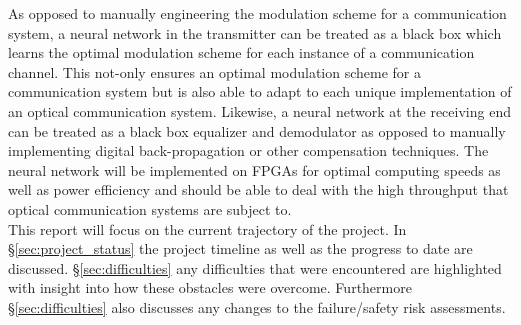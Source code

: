 As opposed to manually engineering the modulation scheme for a communication system, a neural network in the transmitter can be treated as a black box which learns the optimal modulation scheme for each instance of a communication channel. This not-only ensures an optimal modulation scheme for a communication system but is also able to adapt to each unique implementation of an optical communication system. Likewise, a neural network at the receiving end can be treated as a black box equalizer and demodulator as opposed to manually implementing digital back-propagation or other compensation techniques. The neural network will be implemented on FPGAs for optimal computing speeds as well as power efficiency and should be able to deal with the high throughput that optical communication systems are subject to. 
\\

This report will focus on the current trajectory of the project. In \S \ref{sec:project_status} the project timeline as well as the progress to date are discussed. \S \ref{sec:difficulties} any difficulties that were encountered are highlighted with insight into how these obstacles were overcome. Furthermore \S \ref{sec:difficulties} also discusses any changes to the failure/safety risk assessments. 